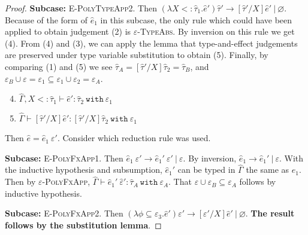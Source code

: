 \documentclass{llncs}
\newcommand{\keywadj}[1]{\mathtt{#1}}
\newcommand{\keyw}[1]{\keywadj{#1}~}
\newcommand{\kw}[1]{\keyw{ #1 }}
\begin{document}
\begin{proof}
\textbf{Subcase:} \textsc{E-PolyTypeApp2}. Then $(\lambda X <: \hat \tau_1. \hat e') \hat \tau' \longrightarrow [\hat \tau'/X]\hat e'~|~\varnothing$. Because of the form of $\hat e_1$ in this subcase, the only rule which could have been applied to obtain judgement (2) is \textsc{$\varepsilon$-TypeAbs}. By inversion on this rule we get (4). From (4) and (3), we can apply the lemma that type-and-effect judgements are preserved under type variable substitution to obtain (5). Finally, by comparing (1) and (5) we see $\hat \tau_A = [\hat \tau'/X]\hat \tau_2 = \hat \tau_B$, and $\varepsilon_B \cup \varepsilon = \varepsilon_1 \subseteq \varepsilon_1 \cup \varepsilon_2 = \varepsilon_A$.

\begin{enumerate}
	\setcounter{enumi}{3}
	\item $\hat \Gamma, X <: \hat \tau_1 \vdash \hat e': \hat \tau_2~\kw{with} \varepsilon_1$
	\item $\hat \Gamma \vdash [\hat \tau'/X]\hat e': [\hat \tau'/X]\hat \tau_2~\kw{with} \varepsilon_1$
\end{enumerate}

 Then $\hat e = \hat e_1~\varepsilon'$. Consider which reduction rule was used.

\textbf{Subcase:} \textsc{E-PolyFxApp1}. Then $\hat e_1~\varepsilon' \longrightarrow \hat e_1'~\varepsilon'~|~\varepsilon$. By inversion, $\hat e_1 \longrightarrow \hat e_1'~|~\varepsilon$. With the inductive hypothesis and subsumption, $\hat e_1'$ can be typed in $\hat \Gamma$ the same as $\hat e_1$. Then by \textsc{$\varepsilon$-PolyFxApp}, $\hat \Gamma \vdash \hat e_1'~\hat \varepsilon': \hat \tau_A~\kw{with} \varepsilon_A$. That $\varepsilon \cup \varepsilon_B \subseteq \varepsilon_A$ follows by inductive hypothesis.

\textbf{Subcase:} \textsc{E-PolyFxApp2}. Then $(\lambda \phi \subseteq \varepsilon_3.\hat e') \varepsilon' \longrightarrow [\varepsilon'/X]\hat e'~|~\varnothing$. \textbf{The result follows by the substitution lemma}.


\end{proof}
\end{document}
